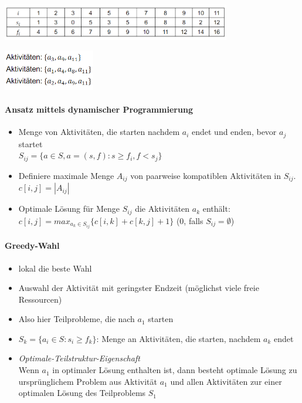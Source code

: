 \documentclass[
    ngerman,
    color=3b,
    dark_mode,
    load_common, %
    summary,
    boxarc,
]{tuda_summary}
\begin{document}
\begin{minipage}{0.6\textwidth}
    \includegraphics[width=10cm]{pictures/aktivProblem1.PNG}
\end{minipage}
\begin{minipage}{0.3\textwidth}
    \includegraphics[width=4cm]{pictures/aktivProblem2.PNG}
\end{minipage}

\paragraph{Ansatz mittels dynamischer Programmierung}
\begin{itemize}
    \item Menge von Aktivitäten, die starten nachdem $a_i$ endet und enden, bevor $a_j$ startet \\
          $S_{ij} = \{a \in S,a = (s,f): s \geq f_i, f < s_j\}$
    \item Definiere maximale Menge $A_{ij}$ von paarweise kompatiblen Aktivitäten in $S_{ij}$. \\
          $c[i,j] = |A_{ij}|$
    \item Optimale Lösung für Menge $S_{ij}$ die Aktivitäten $a_k$ enthält: \\
          $c[i,j] = max_{a_k\in S_{ij}}\{c[i,k] + c[k,j] + 1\}$ ($0$, falls $S_{ij} = \emptyset$)
\end{itemize}

\paragraph{Greedy-Wahl}
\begin{itemize}
    \item lokal die beste Wahl
    \item Auswahl der Aktivität mit geringster Endzeit (möglichst viele freie Ressourcen)
    \item Also hier Teilprobleme, die nach $a_1$ starten
    \item $S_k = \{a_i \in S: s_i \geq f_k\}$: Menge an Aktivitäten, die starten, nachdem $a_k$ endet
    \item \textit{Optimale-Teilstruktur-Eigenschaft} \\
          Wenn $a_1$ in optimaler Lösung enthalten ist, dann besteht optimale Lösung zu ursprünglichem
          Problem aus Aktivität $a_1$ und allen Aktivitäten zur einer optimalen Lösung des
          Teilproblems $S_1$
\end{itemize}
\clearpage
\end{document}
